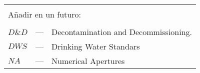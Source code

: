 \begin{longtable}{p{25mm} c p{120mm} }
\\
\\
\multicolumn{3}{l}{Añadir en un futuro:}\\
\\
$D\&D$ & --- & Decontamination and Decommissioning.\\
$DWS$ & --- & Drinking Water Standars\\
$NA$ & --- & Numerical Apertures\\

\end{longtable}
